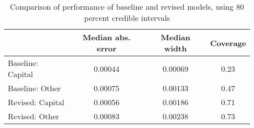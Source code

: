 \begin{table}[ht]
\centering
\caption{Comparison of performance of baseline and revised models, using 80 percent credible intervals} 
\label{tab:performance}
\begin{tabular}{lccc}
  \hline
 & Median abs. error & Median width & Coverage \\ 
  \hline
Baseline: Capital & 0.00044 & 0.00069 & 0.23 \\ 
  Baseline: Other & 0.00075 & 0.00133 & 0.47 \\ 
  Revised: Capital & 0.00056 & 0.00186 & 0.71 \\ 
  Revised: Other & 0.00083 & 0.00238 & 0.73 \\ 
   \hline
\end{tabular}
\end{table}
